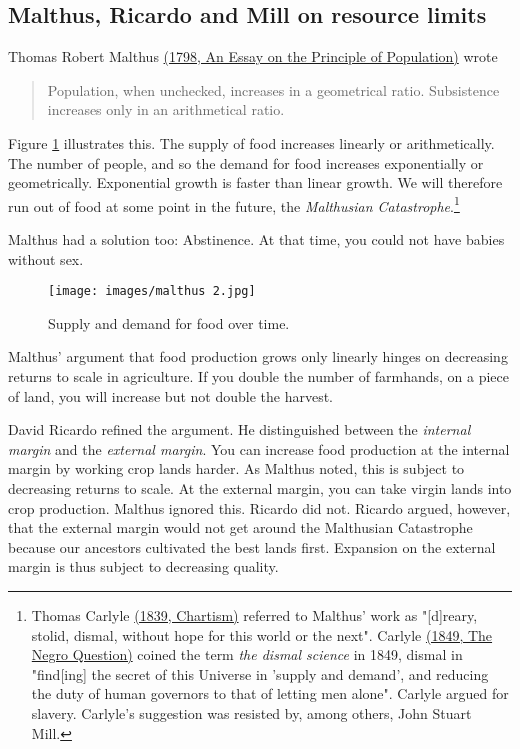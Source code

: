\subsection{Malthus, Ricardo and Mill on resource limits}
\label{sc:malthus}
Thomas Robert Malthus \href{http://www.esp.org/books/malthus/population/malthus.pdf}{(1798, An Essay on the Principle of Population)} wrote
\begin{quote}
    Population, when unchecked, increases in a geometrical ratio. Subsistence increases only in an arithmetical ratio.
\end{quote}
Figure \ref{fig:malthus} illustrates this. The supply of food increases linearly or arithmetically. The number of people, and so the demand for food increases exponentially or geometrically. Exponential growth is faster than linear growth. We will therefore run out of food at some point in the future, the \emph{Malthusian Catastrophe}.\footnote{Thomas Carlyle \href{https://books.google.co.uk/books?id=UNbMBgAAQBAJ}{(1839, Chartism)} referred to Malthus' work as "[d]reary, stolid, dismal, without hope for this world or the next". Carlyle \href{https://books.google.co.uk/books?id=UNbMBgAAQBAJ}{(1849, The Negro Question)} coined the term \emph{the dismal science} in 1849, dismal in "find[ing] the secret of this Universe in 'supply and demand', and reducing the duty of human governors to that of letting men alone". Carlyle argued for slavery. Carlyle's suggestion was resisted by, among others, John Stuart Mill.}

Malthus had a solution too: Abstinence. At that time, you could not have babies without sex.

\begin{figure}
    \centering
    \texttt{[image: images/malthus 2.jpg]}
    \caption{Supply and demand for food over time.}
    \label{fig:malthus}
\end{figure}

Malthus' argument that food production grows only linearly hinges on decreasing returns to scale in agriculture. If you double the number of farmhands, on a piece of land, you will increase but not double the harvest.

David Ricardo refined the argument. He distinguished between the \emph{internal margin} and the \emph{external margin}. You can increase food production at the internal margin by working crop lands harder. As Malthus noted, this is subject to decreasing returns to scale. At the external margin, you can take virgin lands into crop production. Malthus ignored this. Ricardo did not. Ricardo argued, however, that the external margin would not get around the Malthusian Catastrophe because our ancestors cultivated the best lands first. Expansion on the external margin is thus subject to decreasing quality.

